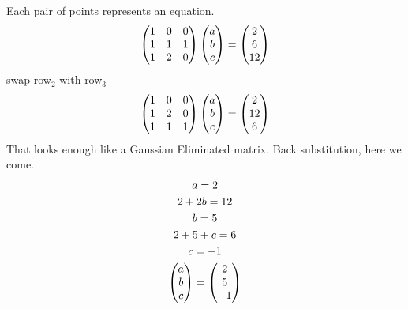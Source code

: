\documentclass{mshw}
\begin{document}
Each pair of points represents an equation.
\begin{gather*}
\begin{pmatrix}
  1 & 0 & 0 \\
  1 & 1 & 1 \\
  1 & 2 & 0 \\
\end{pmatrix}
\begin{pmatrix} a \\ b \\ c \end{pmatrix}
= \begin{pmatrix} 2 \\ 6 \\ 12 \end{pmatrix}
\end{gather*}
swap row$_2$ with row$_3$
\begin{gather*}
\begin{pmatrix}
  1 & 0 & 0 \\
  1 & 2 & 0 \\
  1 & 1 & 1 \\
\end{pmatrix}
\begin{pmatrix} a \\ b \\ c \end{pmatrix}
= \begin{pmatrix} 2 \\ 12 \\ 6 \end{pmatrix}
\end{gather*}
That looks enough like a Gaussian Eliminated matrix.
Back substitution, here we come.
\begin{gather*}
a = 2 \\
2 + 2 b = 12 \\
b = 5 \\
2 + 5 + c = 6 \\
c = -1
\\
\begin{pmatrix} a \\ b \\ c \end{pmatrix} = \begin{pmatrix} 2 \\ 5 \\ -1 \end{pmatrix}
\end{gather*}
\end{document}
